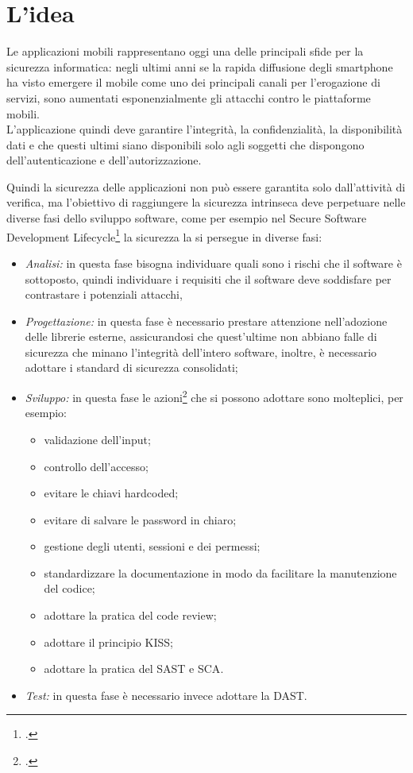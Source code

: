\section{L'idea}\label{sec:l'idea}

Le applicazioni mobili rappresentano oggi una delle principali sfide per la sicurezza informatica: negli ultimi anni se la rapida diffusione degli smartphone ha visto emergere il mobile come uno dei principali canali per l'erogazione di servizi, sono aumentati esponenzialmente gli attacchi contro le piattaforme mobili.\\
L'applicazione quindi deve garantire l'integrità, la confidenzialità, la disponibilità dati e che questi ultimi siano disponibili solo agli soggetti che dispongono dell'autenticazione e dell'autorizzazione.

Quindi la sicurezza delle applicazioni non può essere garantita solo dall'attività di verifica, ma l'obiettivo di raggiungere la sicurezza intrinseca deve perpetuare nelle diverse fasi dello sviluppo software, come per esempio nel Secure Software Development Lifecycle\footcite{site:ssdl} la sicurezza la si persegue in diverse fasi:
\begin{itemize}
    \item \textit{Analisi:} in questa fase bisogna individuare quali sono i rischi che il software è sottoposto, quindi individuare i requisiti che il software deve soddisfare per contrastare i potenziali attacchi,
    \item \textit{Progettazione:} in questa fase è necessario prestare attenzione nell'adozione delle librerie esterne, assicurandosi che quest'ultime non abbiano falle di sicurezza che minano l'integrità dell'intero software, inoltre, è necessario adottare i standard di sicurezza consolidati;
    \item \textit{Sviluppo:} in questa fase le azioni\footcite{site:security-best-practice} che si possono adottare sono molteplici, per esempio:
    \begin{itemize}
        \item validazione dell'input;
        \item controllo dell'accesso;
        \item evitare le chiavi hardcoded;
        \item evitare di salvare le password in chiaro;
        \item gestione degli utenti, sessioni e dei permessi;
        \item standardizzare la documentazione in modo da facilitare la manutenzione del codice;
        \item adottare la pratica del code review;
        \item adottare il principio \gls{KISS};
        \item adottare la pratica del \gls{SAST} e \gls{SCA}.
    \end{itemize}
    \item \textit{Test:} in questa fase è necessario invece adottare la \gls{DAST}.
\end{itemize}

